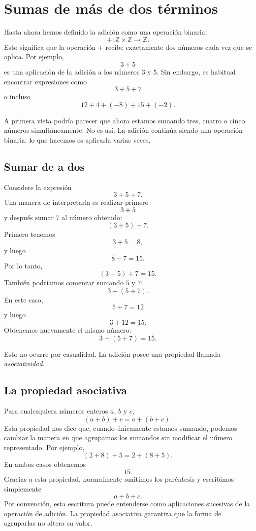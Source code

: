 \section{Sumas de más de dos términos}

Hasta ahora hemos definido la adición como una operación binaria:
\[
+\colon\mathbb{Z}\times\mathbb{Z}\to\mathbb{Z}.
\]
Esto significa que la operación \(+\) recibe exactamente dos números cada vez que se aplica. Por ejemplo,
\[
3+5
\]
es una aplicación de la adición a los números \(3\) y \(5\).
Sin embargo, es habitual encontrar expresiones como
\[
3+5+7
\]
o incluso
\[
12+4+(-8)+15+(-2).
\]

A primera vista podría parecer que ahora estamos sumando tres, cuatro o cinco números simultáneamente. No es así. La adición continúa siendo una operación binaria: lo que hacemos es aplicarla varias veces.

\subsection{Sumar de a dos}

Considere la expresión
\[
3+5+7.
\]
Una manera de interpretarla es realizar primero
\[
3+5
\]
y después sumar \(7\) al número obtenido:
\[
(3+5)+7.
\]
Primero tenemos
\[
3+5=8,
\]
y luego
\[
8+7=15.
\]
Por lo tanto,
\[
(3+5)+7=15.
\]
También podríamos comenzar sumando \(5\) y \(7\):
\[
3+(5+7).
\]
En este caso,
\[
5+7=12
\]
y luego
\[
3+12=15.
\]
Obtenemos nuevamente el mismo número:
\[
3+(5+7)=15.
\]

Esto no ocurre por casualidad. La adición posee una propiedad llamada \emph{asociatividad}.

\subsection{La propiedad asociativa}

Para cualesquiera números enteros \(a\), \(b\) y \(c\),
\[
(a+b)+c=a+(b+c).
\]
Esta propiedad nos dice que, cuando únicamente estamos sumando, podemos cambiar la manera en que agrupamos los sumandos sin modificar el número representado.
Por ejemplo,
\[
(2+8)+5=2+(8+5).
\]
En ambos casos obtenemos
\[
15.
\]
Gracias a esta propiedad, normalmente omitimos los paréntesis y escribimos simplemente
\[
a+b+c.
\]
Por convención, esta escritura puede entenderse como aplicaciones sucesivas de la operación de adición. La propiedad asociativa garantiza que la forma de agruparlas no altera su valor.

